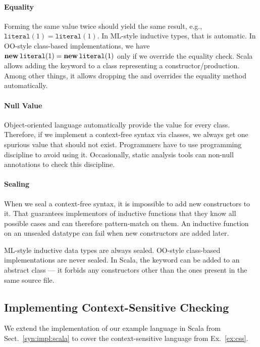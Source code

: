 \paragraph{Equality}
Forming the same value twice should yield the same result, e.g., $\mathtt{literal}(1)=\mathtt{literal}(1)$.
In ML-style inductive types, that is automatic.
In OO-style class-based implementations, we have $\textbf{new}\,\mathtt{literal}(1)=\textbf{new}\,\mathtt{literal}(1)$ only if we override the equality check.
Scala allows adding the keyword  to a class representing a constructor/production.
Among other things, it allows dropping the  and overrides the equality method automatically. 

\paragraph{Null Value}
Object-oriented language automatically provide the  value for every class.
Therefore, if we implement a context-free syntax via classes, we always get one spurious value that should not exist.
Programmers have to use programming discipline to avoid using it.
Occasionally, static analysis tools can non-null annotations to check this discipline.

\paragraph{Sealing}
When we seal a context-free syntax, it is impossible to add new constructors to it.
That guarantees implementors of inductive functions that they know all possible cases and can therefore pattern-match on them.
An inductive function on an unsealed datatype can fail when new constructors are added later.

ML-style inductive data types are always sealed.
OO-style class-based implementations are never sealed.
In Scala, the keyword  can be added to an abstract class --- it forbids any constructors other than the ones present in the same source file.

\subsection{Implementing Context-Sensitive Checking}

We extend the implementation of our example language in Scala from Sect.~\ref{syn:impl:scala} to cover the context-sensitive language from Ex.~\ref{ex:css}.

